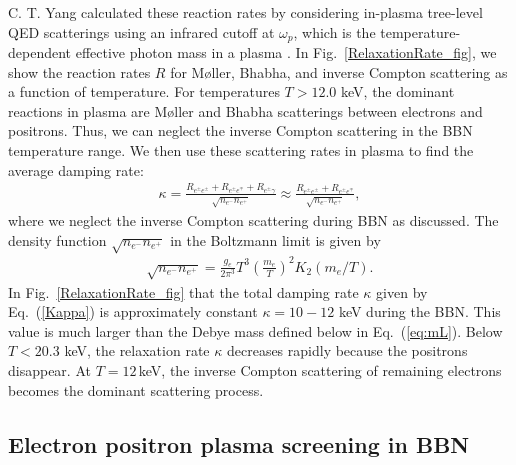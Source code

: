 C. T. Yang calculated these reaction rates by considering in-plasma tree-level QED scatterings using an infrared cutoff at $\omega_p$, which is the temperature-dependent effective photon mass in a plasma \cite{Yang:2024ret}.
In Fig.~\ref{RelaxationRate_fig}, we show the reaction rates $R$ for M{\o}ller, Bhabha, and inverse Compton scattering as a function of temperature. For temperatures $T>12.0$ keV, the dominant reactions in plasma are M{\o}ller and Bhabha scatterings between electrons and positrons. Thus, we can neglect the inverse Compton scattering in the BBN temperature range.
We then use these scattering rates in plasma to find the average damping rate:
\begin{align}\label{Kappa}
\kappa=\frac{R_{e^\pm e^\pm}+R_{e^\pm e^\mp}+R_{e^\pm\gamma}}{\sqrt{n_{e^-}n_{e^+}}}\approx\frac{R_{e^\pm e^\pm}+R_{e^\pm e^\mp}}{\sqrt{n_{e^-}n_{e^+}}},
\end{align}
where we neglect the inverse Compton scattering during BBN as discussed. The density function ${\sqrt{n_{e^-}n_{e^+}}}$ in the Boltzmann limit is given by
\begin{align}
{\sqrt{n_{e^-}n_{e^+}}}=\frac{g_e}{2\pi^3}T^3\left(\frac{m_e}{T}\right)^2K_2(m_e/T).
\end{align}
In Fig.~\ref{RelaxationRate_fig} that the total damping rate $\kappa$ given by Eq.~(\ref{Kappa}) is approximately constant $\kappa=10-12$ keV during the BBN. This value is much larger than the Debye mass defined below in Eq.~(\ref{eq:mL}). Below $T<20.3$ keV, the relaxation rate $\kappa$ decreases rapidly because the positrons disappear. At $T=12$\,keV, the inverse Compton scattering of remaining electrons becomes the dominant scattering process. 

\subsection{Electron positron plasma screening in BBN}\label{sec:Discussion}

